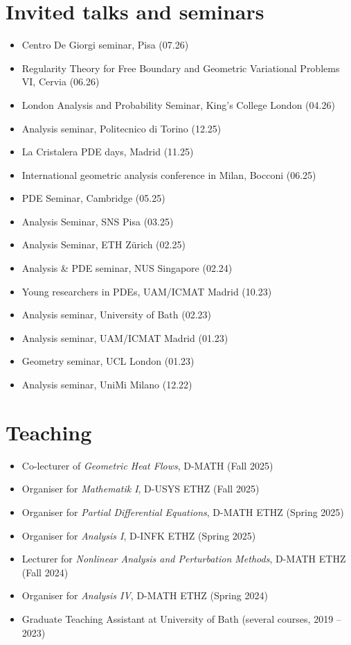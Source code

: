 \documentclass[a4paper,11pt]{article}
\newcommand{\changed}[1]{#1}
\begin{document}
\section*{Invited talks and seminars}
\noindent
\begin{itemize}
    \item \changed{Centro De Giorgi seminar, Pisa (07.26)}
    \item \changed{Regularity Theory for Free Boundary and Geometric Variational Problems VI, Cervia (06.26)}
    \item \changed{London Analysis and Probability Seminar, King's College London (04.26)}
    \item Analysis seminar, Politecnico di Torino (12.25)
    \item La Cristalera PDE days, Madrid (11.25)
    \item International geometric analysis conference in Milan, Bocconi (06.25)
    \item PDE Seminar, Cambridge (05.25)
    \item Analysis Seminar, SNS Pisa (03.25)
    \item Analysis Seminar, ETH Z\"urich (02.25)
    \item Analysis \& PDE seminar, NUS Singapore (02.24)
    \item Young researchers in PDEs, UAM/ICMAT Madrid (10.23)
    \item Analysis seminar, University of Bath (02.23)
    \item Analysis seminar, UAM/ICMAT Madrid (01.23)
    \item Geometry seminar, UCL London (01.23)
    \item Analysis seminar, UniMi Milano (12.22)
\end{itemize}

\vspace{5mm}

\section*{Teaching}
\noindent
\begin{itemize}
    \item Co-lecturer of \emph{Geometric Heat Flows}, D-MATH (Fall 2025)
    \item Organiser for \emph{Mathematik I}, D-USYS ETHZ (Fall 2025)
    \item Organiser for \emph{Partial Differential Equations}, D-MATH ETHZ (Spring 2025)
    \item Organiser for \emph{Analysis I}, D-INFK ETHZ (Spring 2025)
    \item Lecturer for \emph{Nonlinear Analysis and Perturbation Methods}, D-MATH ETHZ (Fall 2024)
    \item Organiser for \emph{Analysis IV}, D-MATH ETHZ (Spring 2024)
    \item Graduate Teaching Assistant at University of Bath (several courses, 2019 -- 2023)
\end{itemize}
\end{document}
